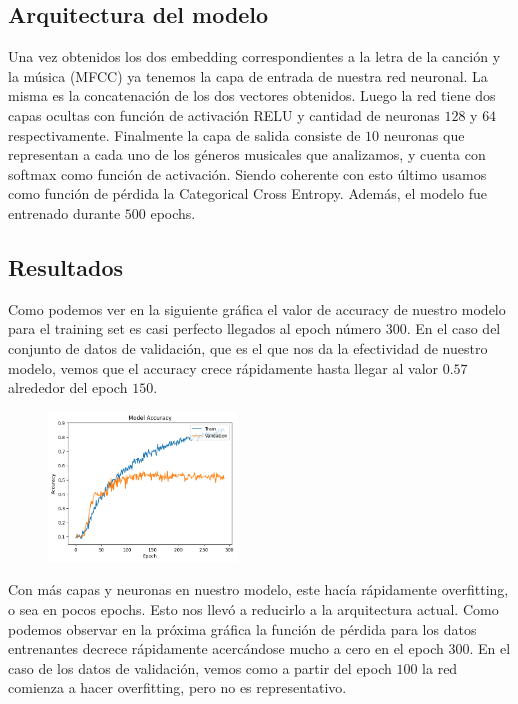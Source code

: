\documentclass[colorinlistoftodos,twoside,twocolumn,10pt]{article} %
\begin{document}
\subsection{Arquitectura del modelo}

Una vez obtenidos los dos embedding correspondientes a la letra de la canci\'on y la m\'usica (MFCC) ya tenemos la capa de entrada de nuestra red neuronal. La misma es la concatenaci\'on de los dos vectores obtenidos. Luego la red tiene  dos capas ocultas con funci\'on de activaci\'on RELU y cantidad de neuronas $128$ y $64$ respectivamente. Finalmente la capa de salida consiste de $10$ neuronas que representan a cada uno de los g\'eneros musicales que analizamos, y cuenta con softmax como funci\'on de activaci\'on. Siendo coherente con esto \'ultimo usamos como funci\'on de p\'erdida la Categorical Cross Entropy. Adem\'as, el modelo fue entrenado durante $500$ epochs.


\subsection{Resultados}

Como podemos ver en la siguiente gr\'afica el valor de accuracy de nuestro modelo para el training set es casi perfecto llegados al epoch n\'umero $300$. En el caso del conjunto de  datos de validaci\'on, que es el que nos da la efectividad de nuestro modelo, vemos que el accuracy crece r\'apidamente hasta llegar al valor $0.57$ alrededor del epoch $150$.

\begin{figure}[h!]
	\includegraphics[width=5cm]{vl_accuracy.png}
\end{figure}

Con m\'as capas y neuronas en nuestro modelo, este hac\'ia r\'apidamente overfitting, o sea en pocos epochs. Esto nos llev\'o a reducirlo a la arquitectura actual. Como podemos observar en la pr\'oxima gr\'afica la funci\'on de p\'erdida para los datos entrenantes decrece r\'apidamente acerc\'andose mucho a cero en el epoch $300$. En el caso de los datos de validaci\'on, vemos como a partir del epoch $100$ la red comienza a hacer overfitting, pero no es representativo. 
\end{document}
